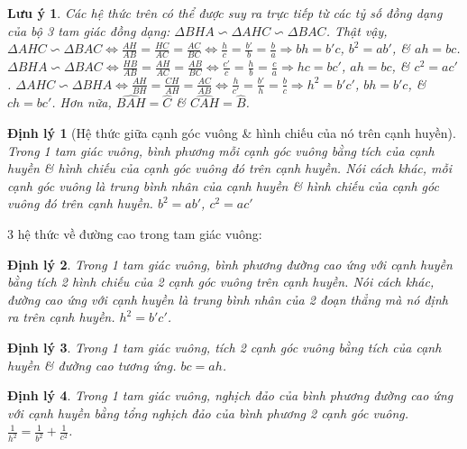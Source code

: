 \documentclass{article}
\newtheorem{dinhly}{Định lý}
\newtheorem{luuy}{Lưu ý}
\begin{document}
\begin{luuy}
	Các hệ thức trên có thể được suy ra trực tiếp từ các tỷ số đồng dạng của bộ 3 tam giác đồng dạng: $\Delta BHA\backsim\Delta AHC\backsim\Delta BAC$. Thật vậy, $\Delta AHC\backsim\Delta BAC\Leftrightarrow\frac{AH}{AB} = \frac{HC}{AC} = \frac{AC}{BC}\Leftrightarrow\frac{h}{c} = \frac{b'}{b} = \frac{b}{a}\Rightarrow bh = b'c$, $b^2 = ab'$, \& $ah = bc$. $\Delta BHA\backsim\Delta BAC\Leftrightarrow\frac{HB}{AB} = \frac{AH}{AC} = \frac{AB}{BC}\Leftrightarrow\frac{c'}{c} = \frac{h}{b} = \frac{c}{a}\Rightarrow hc = bc'$, $ah = bc$, \& $c^2 = ac'$. $\Delta AHC\backsim\Delta BHA\Leftrightarrow\frac{AH}{BH} = \frac{CH}{AH} = \frac{AC}{AB}\Leftrightarrow\frac{h}{c'} = \frac{b'}{h} = \frac{b}{c}\Rightarrow h^2 = b'c'$, $bh = b'c$, \& $ch = bc'$. Hơn nữa, $\widehat{BAH} = \widehat{C}$ \& $\widehat{CAH}= \widehat{B}$.
\end{luuy}

\begin{dinhly}[Hệ thức giữa cạnh góc vuông \& hình chiếu của nó trên cạnh huyền]
	\label{thm: b^2 = ab' c^2 = ac'}
	Trong 1 tam giác vuông, bình phương mỗi cạnh góc vuông bằng tích của cạnh huyền \& hình chiếu của cạnh góc vuông đó trên cạnh huyền. Nói cách khác, mỗi cạnh góc vuông là trung bình nhân của cạnh huyền \& hình chiếu của cạnh góc vuông đó trên cạnh huyền. $b^2 = ab'$, $c^2 = ac'$
\end{dinhly}
3 hệ thức về đường cao trong tam giác vuông:

\begin{dinhly}
	\label{thm: h^2 = b'c'}
	Trong 1 tam giác vuông, bình phương đường cao ứng với cạnh huyền bằng tích 2 hình chiếu của 2 cạnh góc vuông trên cạnh huyền. Nói cách khác, đường cao ứng với cạnh huyền là trung bình nhân của 2 đoạn thẳng mà nó định ra trên cạnh huyền. $h^2 = b'c'$.
\end{dinhly}

\begin{dinhly}
	\label{thm: bc = ah}
	Trong 1 tam giác vuông, tích 2 cạnh góc vuông bằng tích của cạnh huyền \& đường cao tương ứng. $bc = ah$.
\end{dinhly}

\begin{dinhly}
	\label{thm: 1/h^2 = 1/b^2 + 1/c^2}
	Trong 1 tam giác vuông, nghịch đảo của bình phương đường cao ứng với cạnh huyền bằng tổng nghịch đảo của bình phương 2 cạnh góc vuông. $\frac{1}{h^2} = \frac{1}{b^2} + \frac{1}{c^2}$.
\end{dinhly}
\end{document}
